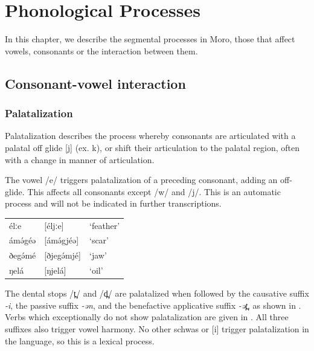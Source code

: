 \chapter{Phonological Processes}

In this chapter, we describe the segmental processes in Moro, those that affect vowels, consonants or the interaction between them. 

\section{Consonant-vowel interaction}

\subsection{Palatalization}
Palatalization describes the process whereby consonants are articulated with a palatal off glide [j] (ex. k), or shift their articulation to the palatal region, often with a change in manner of articulation. 

The vowel /e/ triggers palatalization of a preceding consonant, adding an off-glide. This affects all consonants except /w/ and /j/. This is an automatic process and will not be indicated in further transcriptions.

\ea
\begin{tabular}[t]{lll}
	élːe	&	[éljːe]		&	‘feather’\\
	ámə́géə	&	[ámə́gjéə] 	&	‘scar’\\
	ðegə́mé	&	[ðjegə́mjé] 	&	‘jaw’\\
	ŋelá	&	[ŋjelá]		&	‘oil’\\
\end{tabular}
\z

The dental stops /t̪/ and /d̪/ are palatalized when followed by the causative suffix \textit{-i}, the passive suffix \textit{-ən}, and the benefactive applicative suffix \textit{-ət̪}, as shown in . Verbs which exceptionally do not show palatalization are given in . All three suffixes also trigger vowel harmony. No other schwas or [i] trigger palatalization in the language, so this is a lexical process. 

